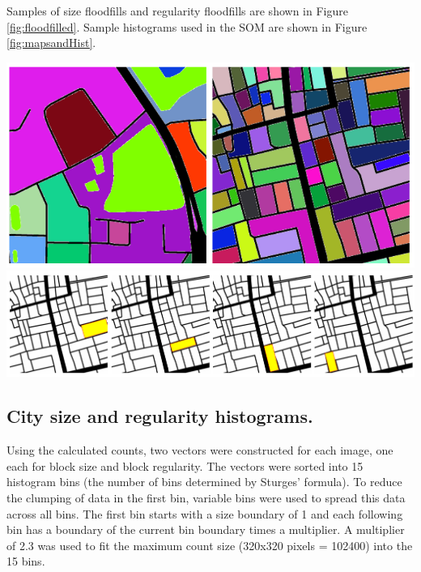 \documentclass{nature}
\makeatletter
\renewenvironment*{figure}{\@float{figure}}{\end@float}
\makeatother
\begin{document}
\begin{methods}
Samples of size floodfills and regularity floodfills are shown in Figure \ref{fig:floodfilled}. Sample histograms used in the SOM are shown in Figure \ref{fig:mapsandHist}.

\begin{figure}
\centering    
\includegraphics[scale=0.8]{Images/FloodSample.png}  
\includegraphics[scale=0.8]{Images/FloodfillRegSample.png}     
\caption{\bf Results of flood filled city blocks. (Top) Floodfills of each individual region to determine size. (Bottom) Bounding boxes outlined in red, filled with yellow and count of yellow pixels used for bounding box size. Underlying black outlined regions used for region size.}    
 \label{fig:floodfilled}  
\end{figure} 

\subsection{City size and regularity histograms.}\label{methodshist}

Using the calculated counts, two vectors were constructed for each image, one each for block size and block regularity. The vectors were sorted into 15 histogram bins (the number of bins determined by Sturges' formula\cite{Sturges1926}). To reduce the clumping of data in the first bin, variable bins were used to spread this data across all bins. The first bin starts with a size boundary of 1 and each following bin has a boundary of the current bin boundary times a multiplier. A multiplier of 2.3 was used to fit the maximum count size (320x320 pixels = 102400) into the 15 bins.


\end{methods}
\end{document}
